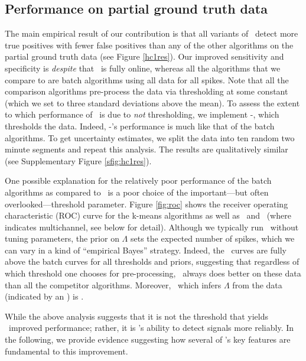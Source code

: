 \subsection{Performance on partial ground truth data}



The main empirical result of our contribution is that all variants of \smug\ detect more true positives with fewer false positives than any of the other algorithms on the partial ground truth data (see Figure \ref{hc1res}).  
Our improved sensitivity and specificity is \emph{despite} that \smug\ is fully online, whereas all the algorithms that we compare to are batch algorithms using all data for all spikes.   Note that all the comparison algorithms pre-process the data via thresholding at some constant (which we set to three standard deviations above the mean).  To assess the extent to which performance of \smug\ is due to \emph{not} thresholding, we implement -\smug, which thresholds the data.  Indeed, -\smug's performance is much like that of the batch algorithms.  To get uncertainty estimates, we split the data into ten random two minute segments and repeat this analysis. The results are qualitatively similar (see Supplementary Figure \ref{sfig:hc1res}).


One possible explanation for the relatively poor performance of the batch algorithms as compared to \smug\ is a poor choice of the important---but often overlooked---threshold parameter.  Figure \ref{fig:roc} shows the receiver operating characteristic (ROC) curve for the k-means algorithms as well as \smug\ and \smug\ (where  indicates multichannel, see below for detail).  Although we typically run \smug\ without tuning parameters, the prior on $\Lambda$ sets the expected number of spikes, which we can vary in a kind of ``empirical Bayes'' strategy.  Indeed, the \smug\ curves are fully above the batch curves for all thresholds and priors, suggesting that regardless of which threshold one chooses for pre-processing, \smug\ always does better on these data than all the competitor algorithms.  Moreover, \smug\ which infers $\Lambda$ from the data (indicated by an ) is .

While the above analysis suggests that it is not the threshold that yields \smug\ improved performance; rather, it is \smug's ability to detect signals more reliably.  In the following, we provide evidence suggesting how several of \smug's key features are fundamental to this improvement.


